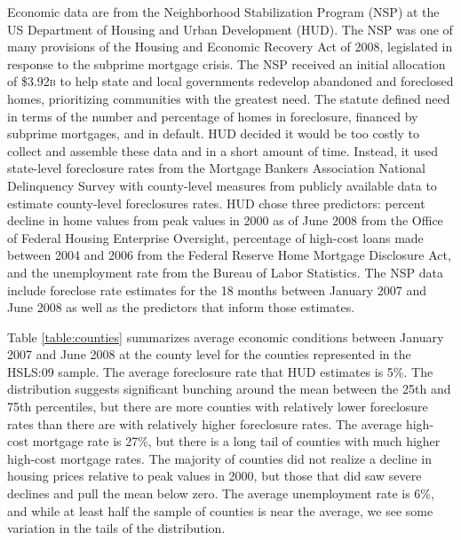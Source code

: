 \documentclass[letterpaper, 12pt]{article}
\begin{document}
Economic data are from the Neighborhood Stabilization Program (NSP) at the US Department of Housing and Urban Development (HUD). The NSP was one of many provisions of the Housing and Economic Recovery Act of 2008, legislated in response to the subprime mortgage crisis. The NSP received an initial allocation of \$3.92\textsc{b} to help state and local governments redevelop abandoned and foreclosed homes, prioritizing communities with the greatest need. The statute defined need in terms of the number and percentage of homes in foreclosure, financed by subprime mortgages, and in default. HUD decided it would be too costly to collect and assemble these data and in a short amount of time. Instead, it used state-level foreclosure rates from the Mortgage Bankers Association National Delinquency Survey with county-level measures from publicly available data to estimate county-level foreclosures rates. HUD chose three predictors: percent decline in home values from peak values in 2000 as of June 2008 from the Office of Federal Housing Enterprise Oversight, percentage of high-cost loans made between 2004 and 2006 from the Federal Reserve Home Mortgage Disclosure Act, and the unemployment rate from the Bureau of Labor Statistics. The NSP data include foreclose rate estimates for the 18 months between January 2007 and June 2008 as well as the predictors that inform those estimates.

Table \ref{table:counties} summarizes average economic conditions between January 2007 and June 2008 at the county level for the counties represented in the HSLS:09 sample. The average foreclosure rate that HUD estimates is 5\%. The distribution suggests significant bunching around the mean between the 25th and 75th percentiles, but there are more counties with relatively lower foreclosure rates than there are with relatively higher foreclosure rates. The average high-cost mortgage rate is 27\%, but there is a long tail of counties with much higher high-cost mortgage rates. The majority of counties did not realize a decline in housing prices relative to peak values in 2000, but those that did saw severe declines and pull the mean below zero. The average unemployment rate is 6\%, and while at least half the sample of counties is near the average, we see some variation in the tails of the distribution.
\end{document}
